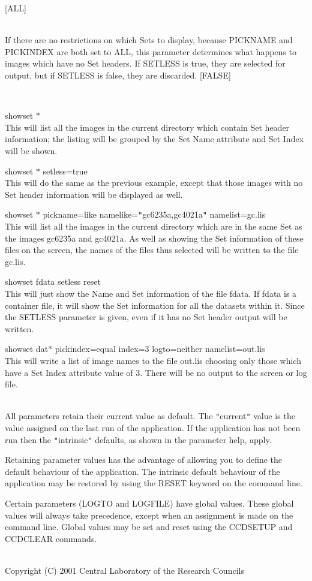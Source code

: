 \documentclass[twoside,11pt]{article}
\newcommand{\htmlref}[2]{#1}
\renewcommand{\_}{\texttt{\symbol{95}}}
\newcommand{\xroutine}[1]{\htmlref{{\sc #1}}{#1}}
\newcommand{\sstexamples}[1]{
   \item[Examples:] \mbox{} \\
   \vspace{-3.5ex}
   \begin{description}
      #1
   \end{description}
}
\newcommand{\sstsubsection}[1]{ \item[{#1}] \mbox{} \\}
\newcommand{\sstexamplesubsection}[2]{\sloppy \item{\ssttt #1} \mbox{} \\ #2 }
\newcommand{\sstdiytopic}[2]{\item[#1:] \mbox{} \\[1.3ex] #2}
\newcommand{\sstexamples}[1]{
      \item[Examples:] \\
      \begin{description}
         #1
      \end{description}
      \\
   }
\newcommand{\sstsubsection}[1]{\item[{#1}]}
\newcommand{\sstexamplesubsection}[2]{\item[{\ssttt #1}] #2}
\newcommand{\sstdiytopic}[2]{\item[{#1}] #2 }
\begin{document}
{{{{         }
         [ALL]
      }
      \sstsubsection{
         SETLESS = \_LOGICAL (Read)
      }{
         If there are no restrictions on which Sets to display, because
         PICKNAME and PICKINDEX are both set to ALL, this parameter
         determines what happens to images which have no Set headers.
         If SETLESS is true, they are selected for output, but if
         SETLESS is false, they are discarded.
         [FALSE]
      }
   }
   \sstexamples{
      \sstexamplesubsection{
         showset $*$
      }{
         This will list all the images in the current directory which
         contain Set header information; the listing will be grouped
         by the Set Name attribute and Set Index will be shown.
      }
      \sstexamplesubsection{
         showset $*$ setless=true
      }{
         This will do the same as the previous example, except that
         those images with no Set header information will be displayed
         as well.
      }
      \sstexamplesubsection{
         showset $*$ pickname=like namelike={\tt "}gc6235a,gc4021a{\tt "} namelist=gc.lis
      }{
         This will list all the images in the current directory which
         are in the same Set as the images gc6235a and gc4021a.
         As well as showing the Set information of these files on
         the screen, the names of the files thus selected will be
         written to the file gc.lis.
      }
      \sstexamplesubsection{
         showset fdata setless reset
      }{
         This will just show the Name and Set information of the file
         fdata.  If fdata is a container file, it will show the
         Set information for all the datasets within it.  Since the
         SETLESS parameter is given, even if it has no Set header
         output will be written.
      }
      \sstexamplesubsection{
         showset dat$*$ pickindex=equal index=3 logto=neither namelist=out.lis
      }{
         This will write a list of image names to the file out.lis
         choosing only those which have a Set Index attribute value
         of 3.  There will be no output to the screen or log file.
      }
   }
   \sstdiytopic{
      Behaviour of Parameters
   }{
      All parameters retain their current value as default. The
      {\tt "}current{\tt "} value is the value assigned on the last run of the
      application. If the application has not been run then the
      {\tt "}intrinsic{\tt "} defaults, as shown in the parameter help, apply.

      Retaining parameter values has the advantage of allowing you to
      define the default behaviour of the application. The intrinsic
      default behaviour of the application may be restored by using the
      RESET keyword on the command line.

      Certain parameters (LOGTO and LOGFILE) have global
      values. These global values will always take precedence, except
      when an assignment is made on the command line. Global values may
      be set and reset using the \xroutine{CCDSETUP} and \xroutine{CCDCLEAR} commands.
   }
   \sstdiytopic{
      Copyright
   }{
      Copyright (C) 2001 Central Laboratory of the Research Councils
   }
}
\end{document}
